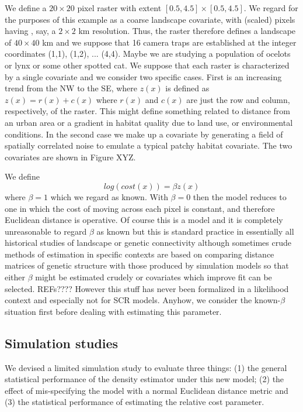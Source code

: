 \documentclass[12pt]{article}
\begin{document}
We define a $20 \times 20$ pixel raster with
extent $[0.5, 4.5] \times [0.5, 4.5]$.
We regard for the purposes of this example as a coarse landscape 
covariate, with (scaled) pixels having ,  say, a $2 \times 2$ km resolution. Thus, the raster
therefore
defines a landscape of $40 \times 40$ km and we suppose that 16 camera
traps are established at the integer coordinates (1,1), (1,2),
... (4,4). 
Maybe we are studying a population of ocelots or lynx or some other
spotted cat.
We suppose 
that each raster is characterized by a single covariate and we consider two specific
cases. First is an increasing trend from 
the NW to the SE, where $z(x)$ is defined as $z(x) = r(x) + c(x)$ where $r(x)$ and $c(x)$ are 
just the row and column, respectively, of the raster. 
This might define something related to distance
from an urban area or a gradient in habitat quality due to land use,
or environmental conditions. 
In the second case we make up a covariate by generating a field of spatially correlated
noise to emulate a typical patchy habitat covariate. The two covariates are shown in 
Figure XYZ. 

We define 
\[
 log(cost(x))=  \beta z(x) 
 \]
where $\beta = 1$ which we regard as known. With $\beta=0$ then the model reduces to
one in which the cost of moving across each pixel is constant, and therefore Euclidean
distance is operative.
 Of course this is a model and it is completely
unreasonable to regard $\beta$ as known but this is standard practice in essentially all
historical studies of landscape or genetic connectivity although sometimes crude methods
of estimation in specific contexts are based on comparing distance matrices of genetic
structure with those produced by simulation models so that either $\beta$ might be estimated
crudely or covariates which improve fit can be selected. REFs????
However this stuff has never been formalized in a likelihood context and especially
not for SCR models. 
Anyhow, we consider the known-$\beta$ situation first before dealing with estimating
this parameter. 


\subsection{Simulation studies}

We devised a limited simulation study to evaluate three things: (1)
the general statistical performance of the density estimator under
this new model; (2) the effect of mis-specifying the model with a
normal Euclidean distance metric and (3) the statistical performance
of estimating the relative cost parameter.
\end{document}
